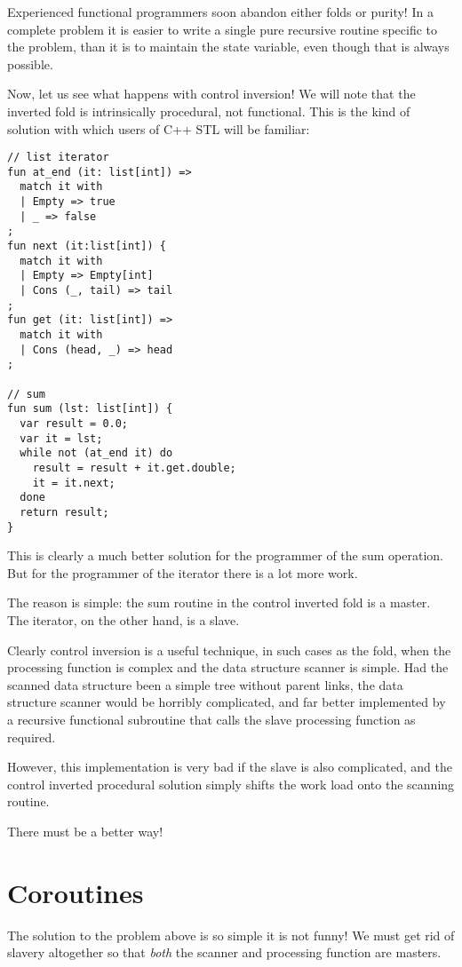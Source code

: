 \documentclass{article}
\begin{document}
Experienced functional programmers soon abandon either folds
or purity! In a complete problem it is easier to write a
single pure recursive routine specific to the problem,
than it is to maintain the state variable, even though that
is always possible.

Now, let us see what happens with control inversion!
We will note that the inverted fold is intrinsically
procedural, not functional. This is the kind of solution
with which users of C++ STL will be familiar:

\begin{verbatim}
// list iterator
fun at_end (it: list[int]) => 
  match it with
  | Empty => true
  | _ => false
;
fun next (it:list[int]) {
  match it with
  | Empty => Empty[int]
  | Cons (_, tail) => tail
;
fun get (it: list[int]) =>
  match it with
  | Cons (head, _) => head
;

// sum
fun sum (lst: list[int]) {
  var result = 0.0;
  var it = lst;
  while not (at_end it) do
    result = result + it.get.double;
    it = it.next;
  done
  return result;
}
\end{verbatim}

This is clearly a much better solution for the programmer
of the sum operation. But for the programmer of the iterator
there is a lot more work.

The reason is simple: the sum routine in the control inverted
fold is a master. The iterator, on the other hand, is a slave.

Clearly control inversion is a useful technique, in such cases
as the fold, when the processing function is complex and the
data structure scanner is simple. Had the scanned data structure
been a simple tree without parent links, the data structure
scanner would be horribly complicated, and far better implemented
by a recursive functional subroutine that calls the slave
processing function as required. 

However, this implementation
is very bad if the slave is also complicated, 
and the control inverted procedural solution simply
shifts the work load onto the scanning routine.

There must be a better way!

\section{Coroutines}
The solution to the problem above is so simple it is not funny!
We must get rid of slavery altogether so that {\em both} the scanner
and processing function are masters.
\end{document}
